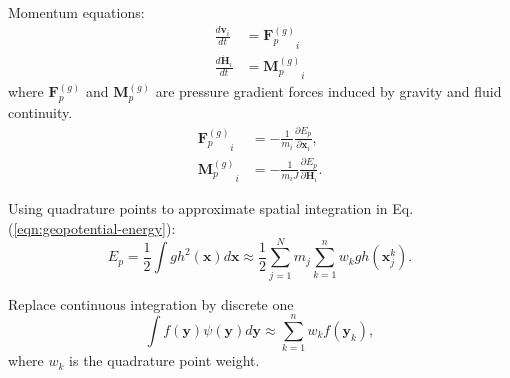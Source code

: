 \documentclass[slidestop,compress,mathserif]{beamer}
\begin{document}
\begin{frame}
  Momentum equations:
  \begin{align}
    \frac{d \mathbf{v}_i}{d t} & = {\mathbf{F}_p^{(g)}}_i \\
    \frac{d \dot{\mathbf{H}}_i}{d t} & = {\mathbf{M}_p^{(g)}}_i
  \end{align}
  where ${\mathbf{F}_p^{(g)}}$ and ${\mathbf{M}_p^{(g)}}$ are pressure gradient forces induced by gravity and fluid continuity.
  \begin{align}
    {\mathbf{F}_p^{(g)}}_i & = - \frac{1}{m_i} \frac{\partial E_p}{\partial \mathbf{x}_i}, \\
    {\mathbf{M}_p^{(g)}}_i & = - \frac{1}{m_i J} \frac{\partial E_p}{\partial \mathbf{H}_i}.
  \end{align}
\end{frame}

\begin{frame}
  Using quadrature points to approximate spatial integration in Eq. (\ref{eqn:geopotential-energy}):
  \begin{equation}
    E_p = \frac{1}{2} \int g h^2(\mathbf{x}) d\mathbf{x} \approx \frac{1}{2} \sum_{j = 1}^{N} m_j \sum_{k = 1}^{n} w_k g h(\mathbf{x}_j^k).
  \end{equation}
  \begin{exampleblock}{Replace continuous integration by discrete one}
    \begin{equation*}
      \int{f(\mathbf{y}) \psi(\mathbf{y}) d\mathbf{y}} \approx \sum_{k = 1}^{n} w_k f(\mathbf{y}_k),
    \end{equation*}
    where $w_k$ is the quadrature point weight.
  \end{exampleblock}
\end{frame}
\end{document}
